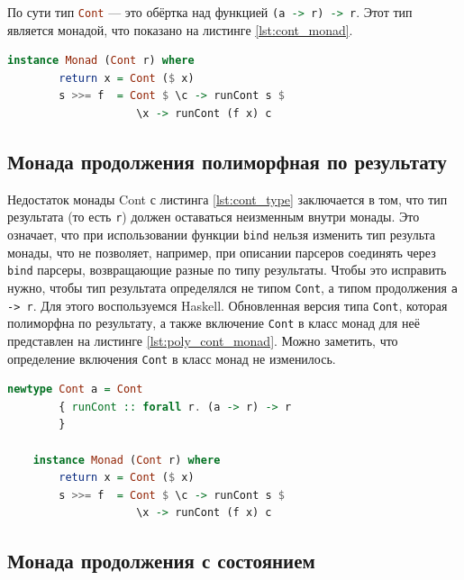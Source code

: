 \documentclass[times]{itmo-student-thesis}
\begin{document}
По сути тип \lstinline[language=Haskell]{Cont} --- это обёртка над функцией \lstinline[language=Haskell]{(a -> r) -> r}.
Этот тип является монадой, что показано на листинге \ref{lst:cont_monad}.

\begin{lstlisting}[language=Haskell,float=!h,caption={Включение типа Cont в класс Monad},label={lst:cont_monad}]
    instance Monad (Cont r) where
        return x = Cont ($ x)
        s >>= f  = Cont $ \c -> runCont s $ 
                    \x -> runCont (f x) c
\end{lstlisting}

\subsection{Монада продолжения полиморфная по результату}\label{sec:poly_cont_monad}

Недостаток монады Cont с листинга \ref{lst:cont_type} заключается в том, что тип результата (то есть
\lstinline{r}) должен оставаться  неизменным внутри монады. Это означает, что при использовании функции \lstinline{bind} нельзя изменить 
тип результа монады, что не позволяет, например, при описании парсеров соединять через \lstinline{bind} парсеры,
возвращающие разные по типу результаты. Чтобы это исправить нужно, чтобы тип результата определялся не типом
\lstinline{Cont}, а типом продолжения \lstinline{a -> r}. Для этого воспользуемся Haskell.
Обновленная версия типа \lstinline{Cont}, которая полиморфна по результату, а также включение \lstinline{Cont} в класс монад
для неё  представлен  на листинге \ref{lst:poly_cont_monad}. Можно заметить, что определение включения \lstinline{Cont} 
в класс монад не изменилось.

\begin{lstlisting}[language=Haskell,float=!h,caption={Монада продолжения полиморфная по результату},label={lst:poly_cont_monad}]
    newtype Cont a = Cont
        { runCont :: forall r. (a -> r) -> r
        }

    instance Monad (Cont r) where
        return x = Cont ($ x)
        s >>= f  = Cont $ \c -> runCont s $ 
                    \x -> runCont (f x) c
\end{lstlisting}

\subsection{Монада продолжения с состоянием}\label{sec:stateful_cont}
\end{document}
